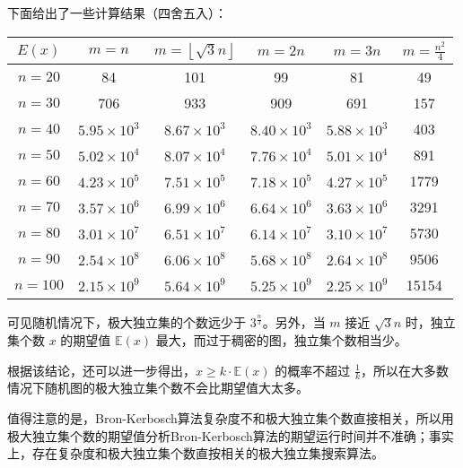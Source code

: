 \documentclass[lang=cn,11pt,a4paper]{elegantpaper}
\newcommand{\E}{\mathbb{E}}
\begin{document}
下面给出了一些计算结果（四舍五入）：
\begin{center}
    \begin{table}[!h]
        \centering
        \begin{tabular}{c|c|c|c|c|c}
            \hline 
            $E(x)$ & $m = n$ & $m = \left\lfloor \sqrt{3}n \right\rfloor$ & $m = 2n$ & $m = 3n$ & $m = \frac{n^2}{4}$ \\
            \hline 
            $n = 20$  & 84 & 101 & 99 & 81 & 49 \\
            \hline 
            $n = 30$  & 706 & 933 & 909 & 691 & 157 \\
            \hline 
            $n = 40$  & $5.95 \times 10^3$ & $8.67 \times 10^3$ & $8.40 \times 10^3$ & $5.88 \times 10^3$ & 403 \\
            \hline 
            $n = 50$  & $5.02 \times 10^4$ & $8.07 \times 10^4$ & $7.76 \times 10^4$ & $5.01 \times 10^4$ & 891 \\
            \hline 
            $n = 60$  & $4.23 \times 10^5$ & $7.51 \times 10^5$ & $7.18 \times 10^5$ & $4.27 \times 10^5$ & 1779 \\
            \hline 
            $n = 70$  & $3.57 \times 10^6$ & $6.99 \times 10^6$ & $6.64 \times 10^6$ & $3.63 \times 10^6$ & 3291 \\
            \hline 
            $n = 80$  & $3.01 \times 10^7$ & $6.51 \times 10^7$ & $6.14 \times 10^7$ & $3.10 \times 10^7$ & 5730 \\
            \hline 
            $n = 90$  & $2.54 \times 10^8$ & $6.06 \times 10^8$ & $5.68 \times 10^8$ & $2.64 \times 10^8$ & 9506 \\
            \hline 
            $n = 100$  & $2.15 \times 10^9$ & $5.64 \times 10^9$ & $5.25 \times 10^9$ & $2.25 \times 10^9$ & 15154 \\
            \hline
        \end{tabular}            
    \end{table}
\end{center}
    
可见随机情况下，极大独立集的个数远少于 $3^{\frac{n}{3}}$。另外，当 $m$ 接近 $\sqrt{3}n$ 时，独立集个数 $x$ 的期望值 $\E(x)$ 最大，而过于稠密的图，独立集个数相当少。

根据该结论，还可以进一步得出，$x \ge k \cdot \E(x)$ 的概率不超过 $\frac{1}{k}$，所以在大多数情况下随机图的极大独立集个数不会比期望值大太多。

值得注意的是，Bron-Kerbosch算法复杂度不和极大独立集个数直接相关，所以用极大独立集个数的期望值分析Bron-Kerbosch算法的期望运行时间并不准确；事实上，存在复杂度和极大独立集个数直按相关的极大独立集搜索算法。
\end{document}
